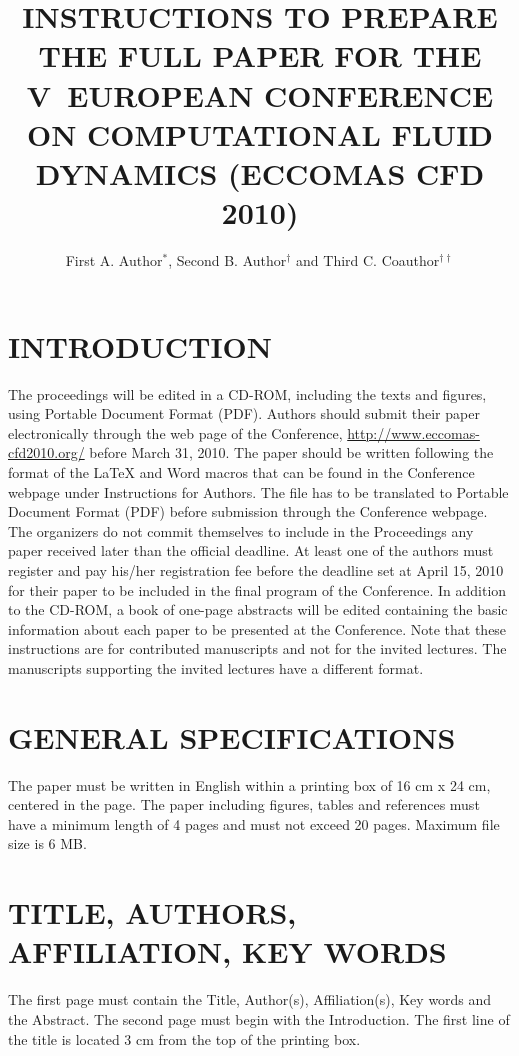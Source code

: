 \documentclass{CFD2010paper}
\title{ INSTRUCTIONS TO PREPARE THE FULL PAPER FOR THE V~EUROPEAN CONFERENCE ON
COMPUTATIONAL FLUID DYNAMICS (ECCOMAS CFD 2010)}
\author{First A. Author$^{*}$, Second B. Author$^{\dag}$ and Third C. Coauthor$^{\dag\dag}$}
\begin{document}



\newpage

\section{INTRODUCTION}
The proceedings will be edited in a CD-ROM, including the texts and figures, using Portable Document Format (PDF). Authors should submit their paper electronically through the web page of the Conference, \underline {http://www.eccomas-cfd2010.org/} before March 31, 2010. The paper should be written following the format of the LaTeX and Word macros that can be found in the Conference webpage under Instructions for Authors. The file has to be translated to Portable Document Format (PDF) before submission through the Conference webpage. The organizers do not commit themselves to include in the Proceedings any paper received later than the official deadline. At least one of the authors must register and pay his/her registration fee before the deadline set at April 15, 2010 for their paper to be included in the final program of the Conference.
In addition to the CD-ROM, a book of one-page abstracts will be edited containing the basic information about each paper to be presented at the Conference. Note that these instructions are for contributed manuscripts and not for the invited lectures. The manuscripts supporting the invited lectures have a different format.

\section{GENERAL SPECIFICATIONS}
The paper must be written in English within a printing box of 16 cm x 24 cm, centered in the page. The paper including figures, tables and references must have a minimum length of 4 pages and must not exceed 20 pages. Maximum file size is 6 MB.

\section{TITLE, AUTHORS, AFFILIATION, KEY WORDS}
The first page must contain the Title, Author(s), Affiliation(s), Key words and the Abstract. The second page must begin with the Introduction. The first line of the title is located 3 cm from the top of the printing box.
\end{document}
